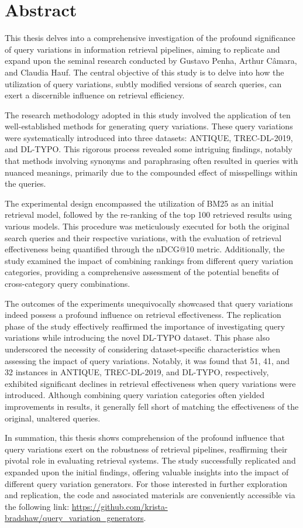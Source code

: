\chapter{Abstract}
This thesis delves into a comprehensive investigation of the profound significance of query variations in information retrieval pipelines, aiming to replicate and expand upon the seminal research conducted by Gustavo Penha, Arthur Câmara, and Claudia Hauf. The central objective of this study is to delve into how the utilization of query variations, subtly modified versions of search queries, can exert a discernible influence on retrieval efficiency.

The research methodology adopted in this study involved the application of ten well-established methods for generating query variations. These query variations were systematically introduced into three datasets: ANTIQUE, TREC-DL-2019, and DL-TYPO. This rigorous process revealed some intriguing findings, notably that methods involving synonyms and paraphrasing often resulted in queries with nuanced meanings, primarily due to the compounded effect of misspellings within the queries.

The experimental design encompassed the utilization of BM25 as an initial retrieval model, followed by the re-ranking of the top 100 retrieved results using various models. This procedure was meticulously executed for both the original search queries and their respective variations, with the evaluation of retrieval effectiveness being quantified through the nDCG@10 metric. Additionally, the study examined the impact of combining rankings from different query variation categories, providing a comprehensive assessment of the potential benefits of cross-category query combinations.

The outcomes of the experiments unequivocally showcased that query variations indeed possess a profound influence on retrieval effectiveness. The replication phase of the study effectively reaffirmed the importance of investigating query variations while introducing the novel DL-TYPO dataset. This phase also underscored the necessity of considering dataset-specific characteristics when assessing the impact of query variations. Notably, it was found that 51, 41, and 32 instances in ANTIQUE, TREC-DL-2019, and DL-TYPO, respectively, exhibited significant declines in retrieval effectiveness when query variations were introduced. Although combining query variation categories often yielded improvements in results, it generally fell short of matching the effectiveness of the original, unaltered queries.

In summation, this thesis shows comprehension of the profound influence that query variations exert on the robustness of retrieval pipelines, reaffirming their pivotal role in evaluating retrieval systems. The study successfully replicated and expanded upon the initial findings, offering valuable insights into the impact of different query variation generators. For those interested in further exploration and replication, the code and associated materials are conveniently accessible via the following link: \url{https://github.com/krista-bradshaw/query_variation_generators}.
